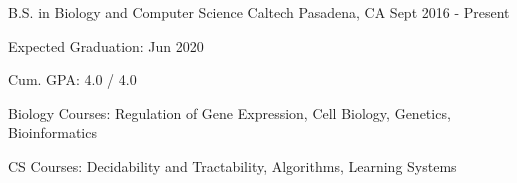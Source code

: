 

\begin{cventries}

  \cventry
    {B.S. in Biology and Computer Science} %
    {Caltech} %
    {Pasadena, CA} %
    {Sept 2016 - Present} %
    {
      \begin{cvitems} %
        \item {Expected Graduation: Jun 2020}
        \item {Cum. GPA: 4.0 / 4.0}
        \item {Biology Courses: Regulation of Gene Expression, Cell Biology, Genetics, Bioinformatics}
        \item {CS Courses: Decidability and Tractability, Algorithms, Learning Systems}
      \end{cvitems}
    }

\end{cventries}
